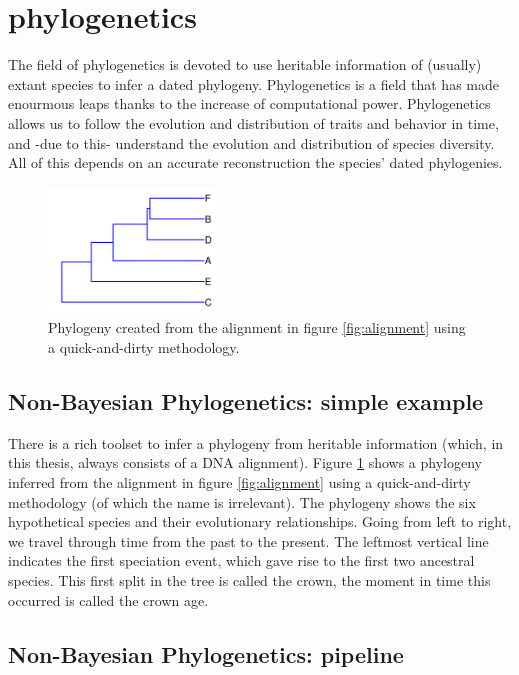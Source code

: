 \section{phylogenetics}

The field of phylogenetics is devoted to
use heritable information of (usually) extant species to
infer a dated phylogeny. Phylogenetics is a field that has
made enourmous leaps thanks to the increase of computational power.
Phylogenetics allows us to follow the evolution and distribution
of traits and behavior in time, and -due to this-
understand the evolution and distribution of species diversity.
All of this depends on an accurate reconstruction the species' dated phylogenies.

\begin{figure}[H]
  \includegraphics[width=0.4\textwidth]{phylogeny_40_upgma.png}
  \caption{
    Phylogeny created from the alignment in figure \ref{fig:alignment} 
    using a quick-and-dirty methodology.
  }
  \label{fig:phylogeny_upgma}
\end{figure}

\subsection{Non-Bayesian Phylogenetics: simple example}

There is a rich toolset to infer a phylogeny from heritable 
information (which, in this thesis, always consists of a DNA alignment).
Figure \ref{fig:phylogeny_upgma} shows a phylogeny inferred
from the alignment 
in figure \ref{fig:alignment} using a quick-and-dirty methodology (of
which the name is irrelevant).
The phylogeny shows the six hypothetical species and their evolutionary 
relationships. Going from left to right, we travel through time from 
the past to the present. 
The leftmost vertical line indicates the first speciation event, 
which gave rise to the first two ancestral species. 
This first split in the tree is called the crown,
the moment in time this occurred is called the crown age.

\subsection{Non-Bayesian Phylogenetics: pipeline}

